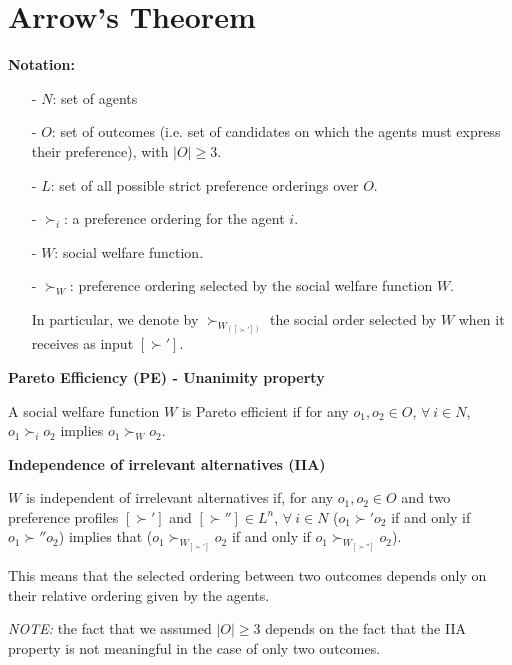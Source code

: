 %
%

\section{Arrow's Theorem}

\bigskip
\noindent \textbf{Notation:}
\begin{itemize}
	\item [-] $N$: set of agents
	\item [-] $O$: set of outcomes (i.e. set of candidates on which the agents 
	must express their preference), with $|O| \geq 3$.
	\item [-] $L$: set of all possible strict preference orderings over $O$.
	\item [-] $\succ_i$: a preference ordering for the agent $i$.
	\item [-] $W$: social welfare function.
	\item [-] $\succ_W$: preference ordering selected by the social welfare 
	function $W$.

	\noindent In particular, we denote by $\succ_{W_{([\succ'])}}$ the social 
	order selected by $W$ when it receives as input $[\succ']$.
\end{itemize}

\bigskip
\noindent \textbf{Pareto Efficiency (PE) - Unanimity property}

\noindent A social welfare function $W$ is Pareto efficient if for any $o_1, o_2 
\in O$, $\forall~i \in N$, $o_1 \succ_i o_2$ implies $o_1 \succ_W o_2$.

\bigskip
\noindent \textbf{Independence of irrelevant alternatives (IIA)}

\noindent $W$ is independent of irrelevant alternatives if, for any $o_1,o_2 
\in O$ and two preference profiles $[\succ']$ and $[\succ''] \in L^n$, 
$\forall~i \in N$ ($o_1 \succ' o_2$ if and only if $o_1 \succ'' o_2$) implies 
that ($o_1 \succ_{W_{[\succ']}} o_2$ if and only if $o_1 \succ_{W_{[\succ'']}} 
o_2$).

\noindent This means that the selected ordering between two outcomes depends 
only on their relative ordering given by the agents.

\noindent \textit{NOTE:} the fact that we assumed $|O| \geq 3$ depends on the 
fact that the IIA property is not meaningful in the case of only two outcomes.

